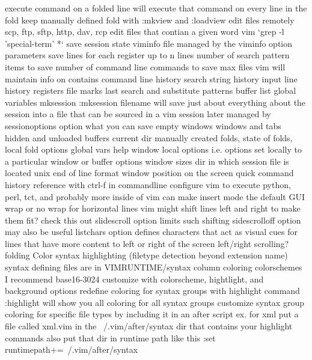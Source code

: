 \documentclass[12pt]{book}
\begin{document}
{    execute command on a folded line will execute that command on every line in the fold
    keep manually defined fold with :mkview and :loadview
  edit files remotely
    scp, ftp, sftp, http, dav, rcp
  edit files that contian a given word
    vim `grep -l 'special-term' *`
  save session state
    viminfo file
      managed by the viminfo option parameters
        save lines for each register up to n lines
        number of search pattern items to save
        number of command line commands to save
        max files vim will maintain info on
      contains
        command line history
        search string history
        input line history
        registers
        file marks
        last search and substitute patterns
        buffer list
        global variables
    mksession
      :mksession filename will save just about everything about the session into a file that can be sourced in a vim session later
      managed by sessionoptions option
      what you can save
        empty windows
        windows and tabs
        hidden and unloaded buffers
        current dir
        manually created folds, state of folds, local fold options
        global vars
        help window
        local options i.e. options set locally to a particular window or buffer
        options
        window sizes
        dir in which session file is located
        unix end of line format
        window position on the screen
  quick command history reference with ctrl-f in commandline
  configure vim to execute python, perl, tct, and probably more inside of vim
  can make insert mode the default
GUI
  wrap or no wrap for horizontal lines
    vim might shift lines left and right to make them fit? check this out
    slidescroll option limits such shifting
    sidescrolloff option may also be useful
    listchars option defines characters that act as visual cues for lines that have more content to left or right of the screen
  left/right scrolling?
  folding
  Color
    syntax highlighting (filetype detection beyond extension name)
      syntax defining files are in VIMRUNTIME/syntax
    column coloring
    colorschemes
      I recommend base16-3024
      customize with colorscheme, hightlight, and background options
      redefine coloring for syntax groups with highlight command
      :highlight will show you all coloring for all syntax groups
      customize syntax group coloring for specific file types by including it in an after script
        ex. for xml put a file called xml.vim in the ~/.vim/after/syntax dir that contains your highlight commands
        also put that dir in runtime path like this :set runtimepath+=~/.vim/after/syntax
}
\end{document}
